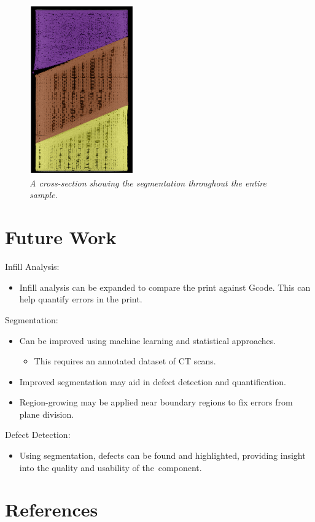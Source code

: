 \documentclass[11pt, letterpaper]{article}
\begin{document}
\begin{figure}[H]
    \centering
    \includegraphics[width=0.4\textwidth]{manual-sep.png}
    \caption{\emph{A cross-section showing the segmentation throughout the entire sample.}}
\end{figure}

\section{Future Work}
\indent Infill Analysis: 
\begin{itemize}
    \item Infill analysis can be expanded to compare the print against Gcode. This can help quantify errors in the print.
\end{itemize}

Segmentation: 
\begin{itemize}
    \item Can be improved using machine learning and statistical approaches.
    \begin{itemize}
        \item This requires an annotated dataset of CT scans.
    \end{itemize}
    \item Improved segmentation may aid in defect detection and quantification.
    \item Region-growing may be applied near boundary regions to fix errors from plane division.
\end{itemize}

Defect Detection:
\begin{itemize}
    \item Using segmentation, defects can be found and highlighted, providing insight into the quality and usability of the component.
\end{itemize}

\section{References}
\printbibliography
\end{document}
